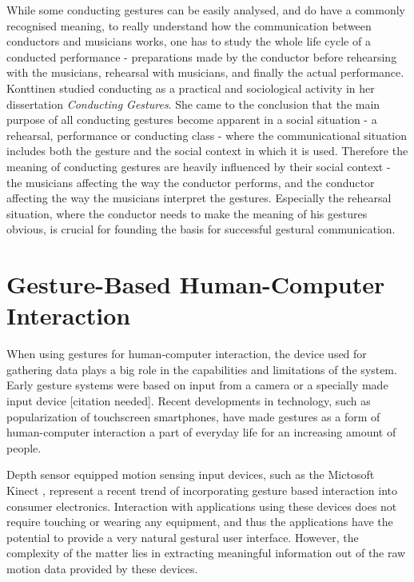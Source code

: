 While some conducting gestures can be easily analysed,
and do have a commonly recognised meaning,
to really understand how the communication between
conductors and musicians works,
one has to study the whole life cycle of a conducted performance -
preparations made by the conductor before rehearsing with the musicians,
rehearsal with musicians,
and finally the actual performance.
Konttinen \cite{konttinen2008} studied
conducting as a practical and sociological activity
in her dissertation \textit{Conducting Gestures}.
She came to the conclusion that the main purpose of all
conducting gestures become apparent in a social situation -
a rehearsal, performance or conducting class -
where the communicational situation includes both the gesture
and the social context in which it is used.
Therefore the meaning of conducting gestures are
heavily influenced by their social context -
the musicians affecting the way the conductor performs,
and the conductor affecting the way the musicians interpret the gestures.
Especially the rehearsal situation,
where the conductor needs to make the meaning of his gestures obvious,
is crucial for founding the basis for successful gestural communication.

\section{Gesture-Based Human-Computer Interaction}

When using gestures for human-computer interaction,
the device used for gathering data plays a big role
in the capabilities and limitations of the system.
Early gesture systems were based on input from
a camera or a specially made input device [citation needed].
Recent developments in technology,
such as popularization of touchscreen smartphones,
have made gestures as a form of human-computer interaction
a part of everyday life for an increasing amount of people.

Depth sensor equipped motion sensing input devices,
such as the Mictosoft Kinect \cite{kinect_overview},
represent a recent trend of incorporating gesture based interaction
into consumer electronics.
Interaction with applications using these devices
does not require touching or wearing any equipment,
and thus the applications have the potential to provide
a very natural gestural user interface.
However, the complexity of the matter lies in extracting
meaningful information out of the raw motion data provided by these devices.


